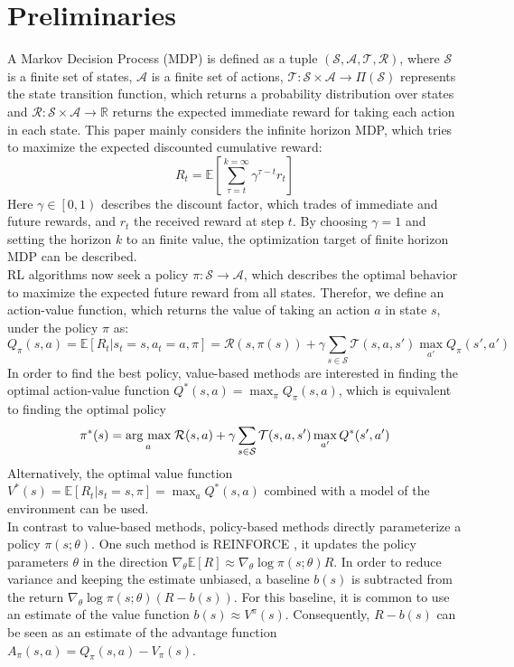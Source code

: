     \section{Preliminaries}
    A Markov Decision Process (MDP) is defined as a tuple $(\mathcal{S}, \mathcal{A}, \mathcal{T},\mathcal{R})$, where $\mathcal{S}$ is a finite set of states, $\mathcal{A}$ is a finite set of actions, $\mathcal{T}:\mathcal{S} \times \mathcal{A} \rightarrow \Pi(\mathcal{S})$ represents the state transition function, which returns a probability distribution over states and 
    $\mathcal{R}:\mathcal{S} \times \mathcal{A} \rightarrow \mathbb{R}$ returns the expected immediate reward for taking each action in each state. 
    This paper mainly considers the infinite horizon MDP, which tries to maximize the expected discounted cumulative reward:
    \[
    R_t = \mathbb{E} \left[ \sum_{\tau=t}^{k=\infty} \gamma^{\tau-t} r_t \right]
	\]
    Here $\gamma \in \left[0,1\right)$ describes the discount factor, which trades of immediate and future rewards, and $r_t$ the received reward at step $t$.
    By choosing $\gamma=1$ and setting the horizon $k$ to an finite value, the optimization target of finite horizon MDP can be described.\\
    RL algorithms now seek a policy $\pi:\mathcal{S} \rightarrow \mathcal{A}$, which describes the optimal behavior to maximize the expected future reward from all states.
    Therefor, we define an action-value function, which returns the value of taking an action $a$ in state $s$, under the policy $\pi$ as:
    \[
    Q_\pi(s,a) = \mathbb{E}\left[R_t|s_t =s,a_t=a,\pi\right] =\mathcal{R}(s,\pi(s)) + \gamma \sum_{s\in\mathcal{S}}\mathcal{T}(s,a,s') \max_{a'}Q_\pi(s',a')
	\]
    In order to find the best policy, value-based methods are interested in finding the optimal action-value function $Q^*(s,a) =\max_\pi Q_\pi(s,a)$, which is equivalent to finding the optimal policy 
    \[
	\pi^*(s) = \underset{a}{\operatorname{arg}\,\operatorname{max}}\; \mathcal{R}(s,a) + \gamma \sum_{s\in\mathcal{S}}\mathcal{T}(s,a,s') \max_{a'}Q^*(s',a')
    \]
    Alternatively, the optimal value function $V^*(s) = \mathbb{E}\left[R_t|s_t=s, \pi\right] = \max_{a} Q^*(s,a)$ combined with a model of the environment can be used.\\
    In contrast to value-based methods, policy-based methods directly parameterize a policy $\pi(s;\theta)$. 
    One such method is REINFORCE \cite{Williams1992}, it updates the policy parameters $\theta$ in the direction $\nabla_\theta \mathbb{E}[R]\approx \nabla_\theta\log\pi(s;\theta)R$.
    In order to reduce variance and keeping the estimate unbiased, a baseline $b(s)$ is subtracted from the return $\nabla_\theta\log\pi(s;\theta)(R - b(s))$. 
    For this baseline, it is common to use an estimate of the value function $b(s)\approx V^\pi(s)$.
    Consequently, $R-b(s)$ can be seen as an estimate of the advantage function $A_\pi(s,a) = Q_\pi(s,a) - V_\pi(s)$.
    
